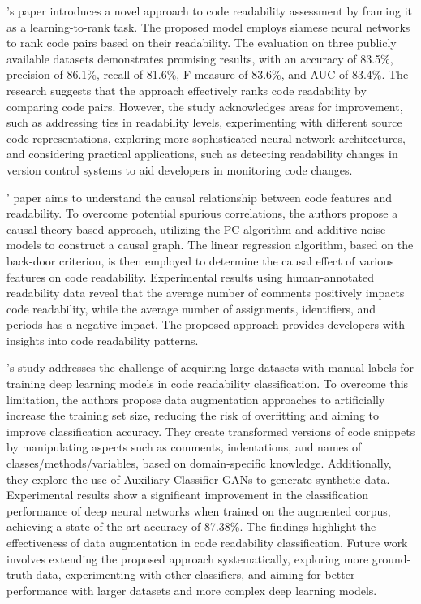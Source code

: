 \documentclass[%
class=scrreprt,
chapterprefix=false,%
open=right,%
twoside=false,%
paper=a4,%
logofile={Logo\_zentral\_farbig\_EN.png},%
thesistype=master,%
UKenglish,%
]{se2thesis}
\begin{document}
	\citeauthor{mi2022rank}'s paper introduces a novel approach to code readability assessment by framing it as a learning-to-rank task. The proposed model employs siamese neural networks to rank code pairs based on their readability. The evaluation on three publicly available datasets demonstrates promising results, with an accuracy of 83.5\%, precision of 86.1\%, recall of 81.6\%, F-measure of 83.6\%, and AUC of 83.4\%. The research suggests that the approach effectively ranks code readability by comparing code pairs. However, the study acknowledges areas for improvement, such as addressing ties in readability levels, experimenting with different source code representations, exploring more sophisticated neural network architectures, and considering practical applications, such as detecting readability changes in version control systems to aid developers in monitoring code changes. 
	
	\citeauthor{mi2023makes}' paper aims to understand the causal relationship between code features and readability. To overcome potential spurious correlations, the authors propose a causal theory-based approach, utilizing the PC algorithm and additive noise models to construct a causal graph. The linear regression algorithm, based on the back-door criterion, is then employed to determine the causal effect of various features on code readability. Experimental results using human-annotated readability data reveal that the average number of comments positively impacts code readability, while the average number of assignments, identifiers, and periods has a negative impact. The proposed approach provides developers with insights into code readability patterns.
	
	\citeauthor{oliveira2020evaluating}'s study addresses the challenge of acquiring large datasets with manual labels for training deep learning models in code readability classification. To overcome this limitation, the authors propose data augmentation approaches to artificially increase the training set size, reducing the risk of overfitting and aiming to improve classification accuracy. They create transformed versions of code snippets by manipulating aspects such as comments, indentations, and names of classes/methods/variables, based on domain-specific knowledge. Additionally, they explore the use of Auxiliary Classifier GANs to generate synthetic data. Experimental results show a significant improvement in the classification performance of deep neural networks when trained on the augmented corpus, achieving a state-of-the-art accuracy of 87.38\%. The findings highlight the effectiveness of data augmentation in code readability classification. Future work involves extending the proposed approach systematically, exploring more ground-truth data, experimenting with other classifiers, and aiming for better performance with larger datasets and more complex deep learning models.
		
\end{document}
